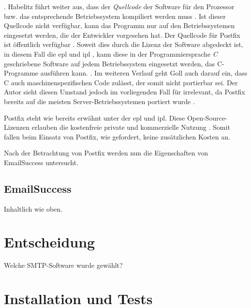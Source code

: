  \citep[][26]{Habelitz2016}.
Habelitz führt weiter aus, dass der \textit{Quellcode} der Software für den Prozessor bzw. das entsprechende Betriebssystem kompiliert werden muss \citep[vgl.][27]{Habelitz2016}. 
Ist dieser Quellcode nicht verfügbar, kann das Programm nur auf den Betriebssystemen eingesetzt werden, die der Entwickler vorgesehen hat. 
Der Quellcode für Postfix ist öffentlich verfügbar \citep[vgl.][]{postfixsource}. 
Soweit dies durch die Lizenz der Software abgedeckt ist, in diesem Fall die \ac{epl} und \ac{ipl} \citep[vgl.][]{postfixsource}, kann diese in der Programmiersprache \textit{C} geschriebene Software auf jedem Betriebssystem eingesetzt werden, das C-Programme ausführen kann.
 \citep[][6]{Goll2014}. Im weiteren Verlauf geht Goll auch darauf ein, dass C auch maschinenspezifischen Code zulässt, der somit nicht portierbar sei. Der Autor sieht diesen Umstand jedoch im vorliegenden Fall für irrelevant, da Postfix bereits auf die meisten Server-Betriebssystemen portiert wurde \citep[vgl.][]{postfixpackages}.

Postfix steht wie bereits erwähnt unter der \ac{epl} und \ac{ipl}. Diese Open-Source-Lizenzen erlauben die kostenfreie private und kommerzielle Nutzung \citep[vgl.][]{postfixlizenz}. Somit fallen beim Einsatz von Postfix, wie gefordert, keine zusätzlichen Kosten an.

Nach der Betrachtung von Postfix werden nun die Eigenschaften von EmailSuccess untersucht.

\section{EmailSuccess}
Inhaltlich wie oben.

\chapter{Entscheidung}
\label{sec:Entscheidung}
Welche SMTP-Software wurde gewählt? 

\chapter{Installation und Tests}

